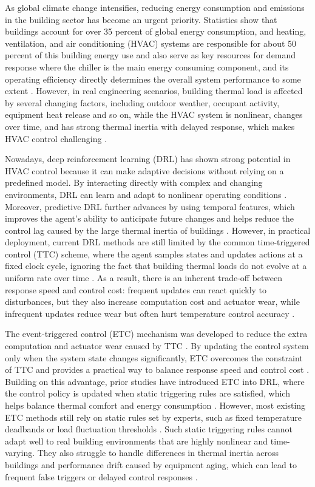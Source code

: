 ﻿\documentclass[preprint,12pt,number]{elsarticle}
\begin{document}
As global climate change intensifies, reducing energy consumption and emissions in the building sector has become an urgent priority. Statistics show that buildings account for over 35 percent of global energy consumption, and heating, ventilation, and air conditioning (HVAC) systems are responsible for about 50 percent of this building energy use and also serve as key resources for demand response where the chiller is the main energy consuming component, and its operating efficiency directly determines the overall system performance to some extent \cite{ref1}. However, in real engineering scenarios, building thermal load is affected by several changing factors, including outdoor weather, occupant activity, equipment heat release and so on, while the HVAC system is nonlinear, changes over time, and has strong thermal inertia with delayed response, which makes HVAC control challenging \cite{ref2}.

Nowadays, deep reinforcement learning (DRL) has shown strong potential in HVAC control because it can make adaptive decisions without relying on a predefined model. By interacting directly with complex and changing environments, DRL can learn and adapt to nonlinear operating conditions \cite{ref3}. Moreover, predictive DRL further advances by using temporal features, which improves the agent's ability to anticipate future changes and helps reduce the control lag caused by the large thermal inertia of buildings \cite{ref4}. However, in practical deployment, current DRL methods are still limited by the common time-triggered control (TTC) scheme, where the agent samples states and updates actions at a fixed clock cycle, ignoring the fact that building thermal loads do not evolve at a uniform rate over time \cite{ref5}. As a result, there is an inherent trade-off between response speed and control cost: frequent updates can react quickly to disturbances, but they also increase computation cost and actuator wear, while infrequent updates reduce wear but often hurt temperature control accuracy \cite{ref6}.

The event-triggered control (ETC) mechanism was developed to reduce the extra computation and actuator wear caused by TTC \cite{ref7}. By updating the control system only when the system state changes significantly, ETC overcomes the constraint of TTC and provides a practical way to balance response speed and control cost \cite{ref8}. Building on this advantage, prior studies have introduced ETC into DRL, where the control policy is updated when static triggering rules are satisfied, which helps balance thermal comfort and energy consumption \cite{ref9}. However, most existing ETC methods still rely on static rules set by experts, such as fixed temperature deadbands or load fluctuation thresholds \cite{ref10}. Such static triggering rules cannot adapt well to real building environments that are highly nonlinear and time-varying. They also struggle to handle differences in thermal inertia across buildings and performance drift caused by equipment aging, which can lead to frequent false triggers or delayed control responses \cite{ref11}.
\end{document}
